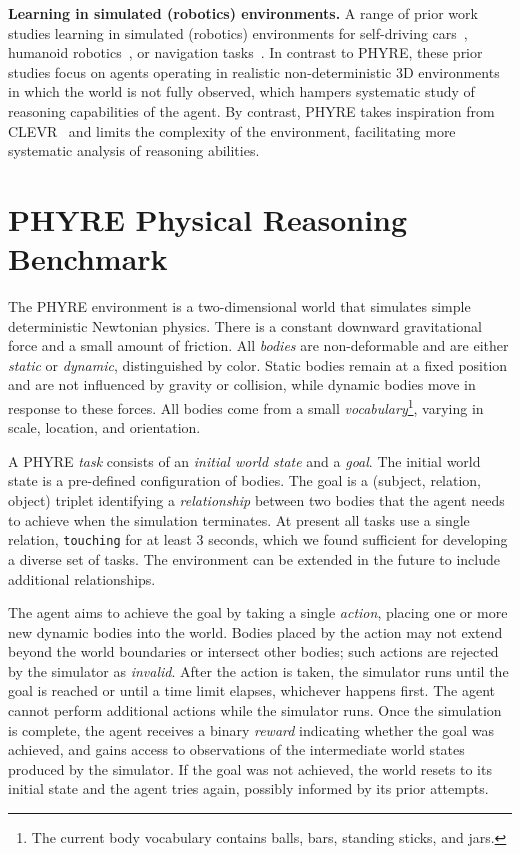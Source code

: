 \documentclass{article}
\begin{document}
\noindent\textbf{Learning in simulated (robotics) environments.} A range of prior work studies learning in simulated (robotics) environments for self-driving cars~\cite{dosovitskiy2017carla}, humanoid robotics~\cite{tudorov2012mujoco}, or navigation tasks~\cite{savva19habitat,wu2018building}. In contrast to PHYRE, these prior studies focus on agents operating in realistic non-deterministic 3D environments in which the world is not fully observed, which hampers systematic study of reasoning capabilities of the agent. By contrast, PHYRE takes inspiration from CLEVR~\cite{johnson2017clevr} and limits the complexity of the environment, facilitating more systematic analysis of reasoning abilities.
 

\section{PHYRE Physical Reasoning Benchmark}
\label{sec:phyre}

The PHYRE environment is a two-dimensional world that simulates simple deterministic Newtonian physics. There is a constant downward gravitational force and a small amount of friction. All \emph{bodies} are non-deformable and are either \emph{static} or \emph{dynamic}, distinguished by color. Static bodies remain at a fixed position and are not influenced by gravity or collision, while dynamic bodies move in response to these forces. All bodies come from a small \emph{vocabulary}\footnote{The current body vocabulary contains balls, bars, standing sticks, and jars.}, varying in scale, location, and orientation.

A PHYRE \emph{task} consists of an \emph{initial world state} and a \emph{goal}. The initial world state is a pre-defined configuration of bodies. The goal is a (subject, relation, object) triplet identifying a \emph{relationship} between two bodies that the agent needs to achieve when the simulation terminates. At present all tasks use a single relation, \texttt{touching} for at least 3 seconds, which we found sufficient for developing a diverse set of tasks. The environment can be extended in the future to include additional relationships.

The agent aims to achieve the goal by taking a single \emph{action}, placing one or more new dynamic bodies into the world. Bodies placed by the action may not extend beyond the world boundaries or intersect other bodies; such actions are rejected by the simulator as \emph{invalid}. After the action is taken, the simulator runs until the goal is reached or until a time limit elapses, whichever happens first. The agent cannot perform additional actions while the simulator runs. Once the simulation is complete, the agent receives a binary \emph{reward} indicating whether the goal was achieved, and gains access to observations of the intermediate world states produced by the simulator. If the goal was not achieved, the world resets to its initial state and the agent tries again, possibly informed by its prior attempts.
\end{document}
